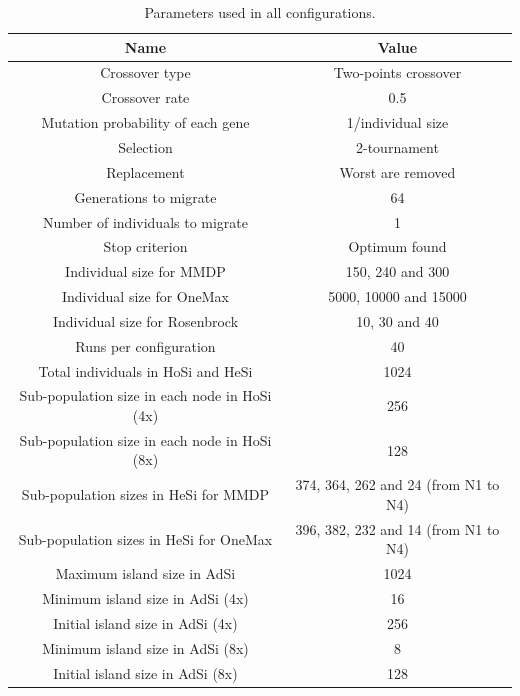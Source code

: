 \documentclass[final,1p,times]{elsarticle}
\begin{document}
\begin{table}
\centering
\caption{Parameters used in all configurations.}
\begin{tabular}{|c|c|} \hline
Name & Value\\ \hline

Crossover type & Two-points crossover \\ \hline
Crossover rate & 0.5\\ \hline
Mutation probability of each gene & 1/individual size\\ \hline
Selection & 2-tournament \\ \hline
Replacement & Worst are removed\\ \hline
Generations to migrate & 64 \\ \hline
Number of individuals to migrate & 1 \\ \hline
Stop criterion & Optimum found \\ \hline
Individual size for MMDP & 150, 240 and 300  \\ \hline
Individual size for OneMax & 5000, 10000 and 15000 \\ \hline
Individual size for Rosenbrock & 10, 30 and 40 \\ \hline
Runs per configuration & 40 \\ \hline
\hline
Total individuals in HoSi and HeSi & 1024\\ \hline \hline
Sub-population size in each node in HoSi (4x) & 256  \\ \hline
Sub-population size in each node in HoSi (8x) & 128  \\ \hline
Sub-population sizes in HeSi for MMDP & 374, 364, 262 and 24 (from N1 to N4)\\ \hline
Sub-population sizes in HeSi for OneMax & 396,  382, 232 and 14 (from N1 to N4)\\ \hline
\hline
Maximum island size in AdSi & 1024 \\ \hline
Minimum island size in AdSi (4x) & 16 \\ \hline
Initial island size in AdSi (4x) & 256 \\ \hline 
Minimum island size in AdSi (8x) & 8 \\ \hline
Initial island size in AdSi (8x) & 128 \\ \hline 
\end{tabular}
\label{table:parameters}
\end{table}
\end{document}
